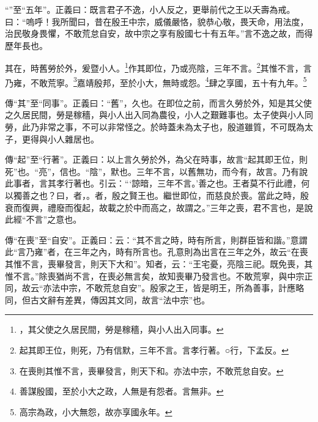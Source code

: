 {\noindent\shu{}\fzkt “”至“五年”。正義曰：既言君子不逸，小人反之，更舉前代之王以夭壽為戒。曰：“嗚呼！我所聞曰，昔在殷王中宗，威儀嚴恪，貌恭心敬，畏天命，用法度，治民敬身畏懼，不敢荒怠自安，故中宗之享有殷國七十有五年。”言不逸之故，而得歷年長也。 \par}

其在，時舊勞於外，爰暨小人。\footnote{，其父使之久居民間，勞是稼穡，與小人出入同事。}作其即位，乃或亮陰，三年不言。\footnote{起其即王位，則死，乃有信默，三年不言。言孝行著。○行，下孟反。}其惟不言，言乃雍，不敢荒寧。\footnote{在喪則其惟不言，喪畢發言，則天下和。亦法中宗，不敢荒怠自安。}嘉靖殷邦，至於小大，無時或怨。\footnote{善謀殷國，至於小大之政，人無是有怨者。言無非。}肆之享國，五十有九年。\footnote{高宗為政，小大無怨，故亦享國永年。}


{\noindent\zhuan{}\fzbyks 傳“其”至“同事”。正義曰：“舊”，久也。在即位之前，而言久勞於外，知是其父使之久居民間，勞是稼穡，與小人出入同為農役，小人之艱難事也。太子使與小人同勞，此乃非常之事，不可以非常怪之。於時蓋未為太子也，殷道雖質，不可既為太子，更得與小人雜居也。 \par}

{\noindent\zhuan{}\fzbyks 傳“起”至“行著”。正義曰：以上言久勞於外，為父在時事，故言“起其即王位，則死”也。“亮”，信也。“陰”，默也。三年不言，以舊無功，而今有，故言。乃有說此事者，言其孝行著也。引云：“‘諒暗，三年不言。’善之也。王者莫不行此禮，何以獨善之也？曰，者，。者，殷之賢王也。繼世即位，而慈良於喪。當此之時，殷衰而復興，禮廢而復起，故載之於中而高之，故謂之。”三年之喪，君不言也，是說此經“不言”之意也。 \par}

{\noindent\zhuan{}\fzbyks 傳“在喪”至“自安”。正義曰：云：“其不言之時，時有所言，則群臣皆和諧。”意謂此“言乃雍”者，在三年之內，時有所言也。孔意則為出言在三年之外，故云“在喪其惟不言，喪畢發言，則天下大和”。知者，云：“王宅憂，亮陰三祀。既免喪，其惟不言。”除喪猶尚不言，在喪必無言矣，故知喪畢乃發言也。不敢荒寧，與中宗正同，故云“亦法中宗，不敢荒怠自安”。殷家之王，皆是明王，所為善事，計應略同，但古文辭有差異，傳因其文同，故言“法中宗”也。 \par}

